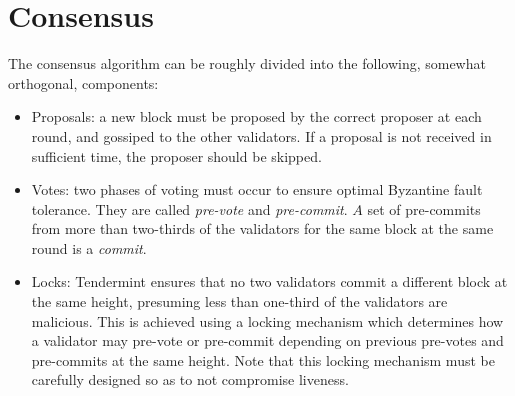 \section{Consensus}

The consensus algorithm can be roughly divided into the following, somewhat orthogonal, components:

\begin{itemize}

\item{Proposals: a new block must be proposed by the correct proposer at each round, and gossiped to the other validators. If a proposal is not received in sufficient time, the proposer should be skipped.}

\item{Votes: two phases of voting must occur to ensure optimal Byzantine fault tolerance. They are called \emph{pre-vote} and \emph{pre-commit}. $A$ set of pre-commits from more than two-thirds of the validators for the same block at the same round is a \emph{commit}.}

\item{Locks: Tendermint ensures that no two validators commit a different block at the same height, presuming less than one-third of the validators are malicious. This is achieved using a locking mechanism which determines how a validator may pre-vote or pre-commit depending on previous pre-votes and pre-commits at the same height. Note that this locking mechanism must be carefully designed so as to not compromise liveness.}

\end{itemize}

